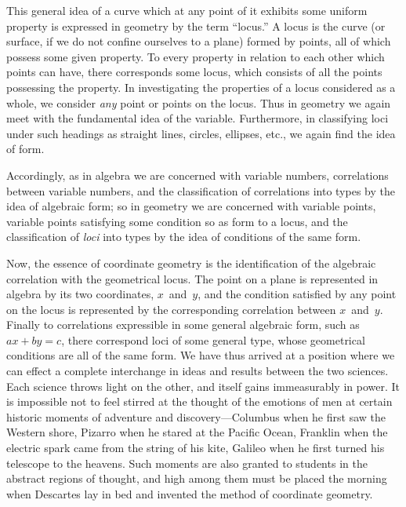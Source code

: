 \documentclass[12pt,leqno]{book}[2005/09/16]
\newcommand{\PageSep}[1]{\ignorespaces}
\begin{document}
This general idea of a curve which at any
\PageSep{121}
%
point of it exhibits some uniform property is
expressed in geometry by the term ``locus.''
A locus is the curve (or surface, if we do not
confine ourselves to a plane) formed by points,
all of which possess some given property.
To every property in relation to each other
which points can have, there corresponds
some locus, which consists of all the points
possessing the property. In investigating
the properties of a locus considered as a whole,
we consider \emph{any} point or points on the locus.
Thus in geometry we again meet with the
fundamental idea of the variable. Furthermore,
in classifying loci under such headings
as straight lines, circles, ellipses, etc., we again
find the idea of form.

Accordingly, as in algebra we are concerned
with variable numbers, correlations between
variable numbers, and the classification of
correlations into types by the idea of algebraic
form; so in geometry we are concerned with
variable points, variable points satisfying
some condition so as form to a locus, and the
classification of \emph{loci} into types by the idea of
conditions of the same form.

Now, the essence of coordinate geometry
is the identification of the algebraic correlation
with the geometrical locus. The point
on a plane is represented in algebra by its
two coordinates, $x$~and~$y$, and the condition
satisfied by any point on the locus is represented
\PageSep{122}
by the corresponding correlation
between $x$~and~$y$. Finally to correlations
expressible in some general algebraic form,
such as $ax + by = c$, there correspond loci of
some general type, whose geometrical conditions
are all of the same form. We
have thus arrived at a position where we
can effect a complete interchange in ideas
and results between the two sciences. Each
science throws light on the other, and itself
gains immeasurably in power. It is impossible
not to feel stirred at the thought
of the emotions of men at certain historic
moments of adventure and discovery---Columbus
%
when he first saw the Western
shore, Pizarro when he stared at the Pacific
%
Ocean, Franklin when the electric spark came
%
from the string of his kite, Galileo when he
%
first turned his telescope to the heavens.
Such moments are also granted to students
in the abstract regions of thought, and high
among them must be placed the morning when
Descartes lay in bed and invented the method
%
of coordinate geometry.
\end{document}
